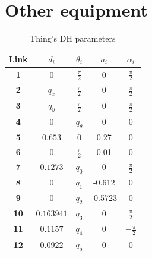 \documentclass[times, utf8, diplomski, english]{fer}
\begin{document}



\appendix
\chapter{Other equipment}
\begin{table}
\caption{Thing's DH parameters}
 \begin{tabular}{@{}ccccc@{}}
  \toprule
 \textbf{Link}& $d_i$& $\theta_i$& $a_i$ & $\alpha_i$\\ \midrule \midrule
 \textbf{1} & $0$ & $\frac{\pi}{2}$ & $0$& $\frac{\pi}{2}$\\ \midrule
 \textbf{2} & $q_x$ & $\frac{\pi}{2}$ & $0$& $\frac{\pi}{2}$\\ \midrule
 \textbf{3} & $q_y$ & $\frac{\pi}{2}$ & $0$& $\frac{\pi}{2}$\\ \midrule
 \textbf{4} & $0$ &$q_{\theta}$ & 0& 0\\ \midrule
 \textbf{5} & $0.653$ & $0$ & 0.27& 0\\ \midrule
 \textbf{6} & $0$ & $\frac{\pi}{2}$ & 0.01& 0\\ \midrule
 \textbf{7} & $0.1273$ & $q_0$ & 0& $\frac{\pi}{2}$\\ \midrule
 \textbf{8} & $0$ & $q_1$ & -0.612& 0\\ \midrule
 \textbf{9} & $0$ & $q_2$ & -0.5723& 0\\ \midrule
 \textbf{10} & $ 0.163941$ & $q_3$ & 0& $\frac{\pi}{2}$\\ \midrule
 \textbf{11} & $0.1157$ & $q_4$ & 0& $-\frac{\pi}{2}$\\ \midrule
 \textbf{12} & $0.0922$ & $q_5$ & 0& 0\\ \bottomrule
 \end{tabular}
\label{DH}
\end{table}
\end{document}
